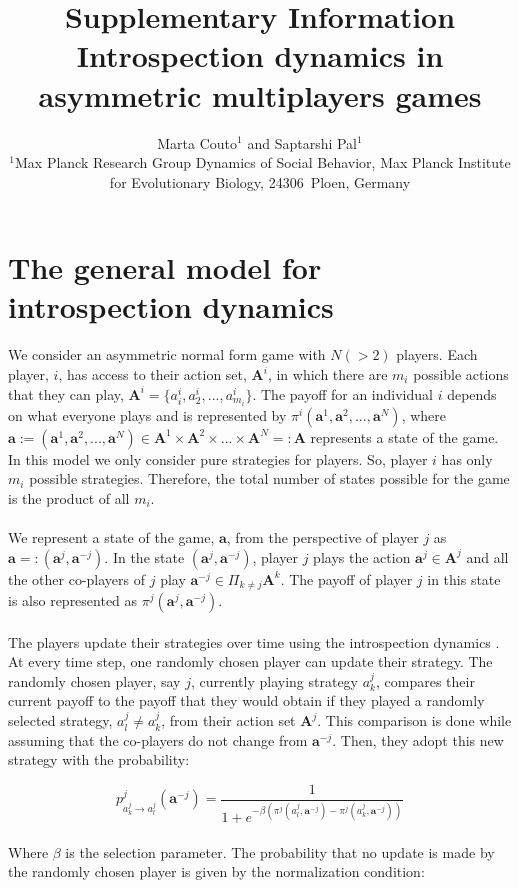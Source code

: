 \documentclass[11pt]{article}
\title{\sffamily \Large Supplementary Information\\[0.1cm] {\bfseries Introspection dynamics in asymmetric multiplayers games}}
\date{\empty}
\author{\parbox[c]{16cm}{\centering \onehalfspacing \fontsize{11}{12}\selectfont Marta Couto$^1$ and Saptarshi Pal$^1$\\[0.2cm]
$^1$Max Planck Research Group Dynamics of Social Behavior, Max Planck Institute for Evolutionary Biology, 24306~Ploen, Germany}}
\theoremstyle{plainCl1}
\theoremstyle{plainCl2}
\newcommand{\A}{\mathbf{A}}
\newcommand{\abf}{\mathbf{a}}
\begin{document}
\maketitle
\onehalfspacing
\section*{The general model for introspection dynamics}
We consider an asymmetric normal form game with $N (>2)$ players. Each player, $i$, has access to their action set, $\A^i$, in which there are $m_i$ possible actions that they can play, $\A^i = \{a^i_i, a^i_2, ..., a^i_{m_i}\}$. The payoff for an individual $i$ depends on what everyone plays and is represented by $\pi^i(\abf^1, \abf^2, ..., \abf^N)$, where $\abf := (\abf^1, \abf^2,...,\abf^N) \in \A^1 \times \A^2 \times ... \times \A^N =: \A$ represents a state of the game. In this model we only consider pure strategies for players. So, player $i$ has only $m_i$ possible strategies. Therefore, the total number of states possible for the game is the product of all $m_i$. 
\\ \\
\noindent We represent a state of the game, $\abf$, from the perspective of player $j$ as $\abf =: (\abf^j, \abf^{-j})$. In the state $(\abf^j, \abf^{-j})$, player $j$ plays the action $\abf^j \in \A^j$ and all the other co-players of $j$ play $\abf^{-j} \in \Pi_{k \neq j} \A^k$. The payoff of player $j$ in this state is also represented as $\pi^j(\abf^j, \abf^{-j})$.
\\ \\
\noindent The players update their strategies over time using the introspection dynamics \cite{couto2022introspection}. At every time step, one randomly chosen player can update their strategy. The randomly chosen player, say $j$, currently playing strategy $a^j_k$, compares their current payoff to the payoff that they would obtain if they played a randomly selected strategy,  $a^j_l \neq a^j_k$, from their action set $\A^j$. This comparison is done while assuming that the co-players do not change from $\abf^{-j}$. Then, they adopt this new strategy  with the probability: 

\begin{equation}
 p^j_{a^j_k \to a^j_l} (\abf^{-j})= \frac{1}{1 + e^{\displaystyle -\beta(\pi^j(a^j_l, \abf^{-j}) - \pi^j(a^j_k, \abf^{-j}))}}
 \label{Eq:introspection-update}
\end{equation}
\\
\noindent Where $\beta$ is the selection parameter. The probability that no update is made by the randomly chosen player is given by the normalization condition: 
\end{document}
